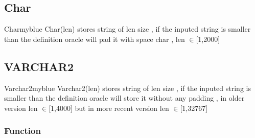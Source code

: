 \vspace{0.5cm}
\subsection{Char}

\begin{prettyBox}{Char}{myblue}
Char(len) stores string of len size , if the inputed string is smaller than the definition
oracle will pad it with space char , len \(\in\)[1,2000]
\end{prettyBox}

\vspace{0.25cm}
\subsection{VARCHAR2}

\begin{prettyBox}{Varchar2}{myblue}
Varchar2(len) stores string of len size , if the inputed string is smaller than the definition
oracle will store it without any padding , in older version len \(\in\)[1,4000] but in more recent
version len \(\in\)[1,32767] 
\end{prettyBox}



\vspace{0.5cm}
\subsubsection{Function}

